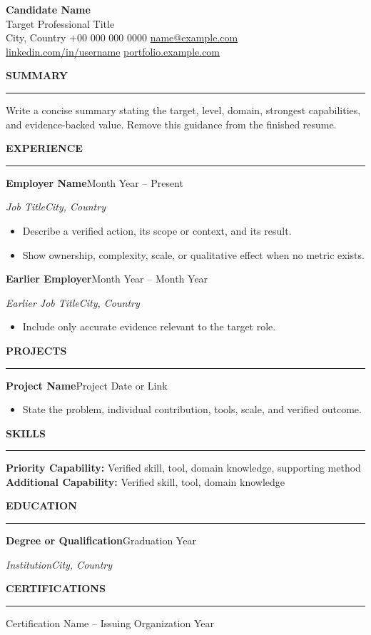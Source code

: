\documentclass[10pt,a4paper]{article}
\newcommand{\resumeSection}[1]{%
  \vspace{10pt}%
  {\large\bfseries\MakeUppercase{#1}}\par
  \vspace{1pt}\hrule\vspace{4pt}%
}
\newcommand{\resumeRole}[2]{%
  \textbf{#1}\hfill #2\par\vspace{1pt}%
}
\newcommand{\resumeSubrole}[2]{%
  \textit{#1}\hfill \textit{#2}\par\vspace{2pt}%
}
\begin{document}
\begin{center}
  {\Huge\bfseries Candidate Name}\\[5pt]
  {\large Target Professional Title}\\[6pt]
  {\small City, Country \textbar{} +00 000 000 0000 \textbar{}
  \href{mailto:name@example.com}{name@example.com}}\\[3pt]
  {\small \href{https://www.linkedin.com/in/username}{linkedin.com/in/username}
  \textbar{} \href{https://portfolio.example.com}{portfolio.example.com}}
\end{center}

\vspace{4pt}

\resumeSection{Summary}
Write a concise summary stating the target, level, domain, strongest capabilities,
and evidence-backed value. Remove this guidance from the finished resume.

\resumeSection{Experience}
\resumeRole{Employer Name}{Month Year -- Present}
\resumeSubrole{Job Title}{City, Country}
\begin{itemize}
  \item Describe a verified action, its scope or context, and its result.
  \item Show ownership, complexity, scale, or qualitative effect when no metric exists.
\end{itemize}

\resumeRole{Earlier Employer}{Month Year -- Month Year}
\resumeSubrole{Earlier Job Title}{City, Country}
\begin{itemize}
  \item Include only accurate evidence relevant to the target role.
\end{itemize}

\resumeSection{Projects}
\resumeRole{Project Name}{Project Date or Link}
\begin{itemize}
  \item State the problem, individual contribution, tools, scale, and verified outcome.
\end{itemize}

\resumeSection{Skills}
\textbf{Priority Capability:} Verified skill, tool, domain knowledge, supporting method \\[3pt]
\textbf{Additional Capability:} Verified skill, tool, domain knowledge

\resumeSection{Education}
\resumeRole{Degree or Qualification}{Graduation Year}
\resumeSubrole{Institution}{City, Country}

\resumeSection{Certifications}
Certification Name -- Issuing Organization \hfill Year
\end{document}
